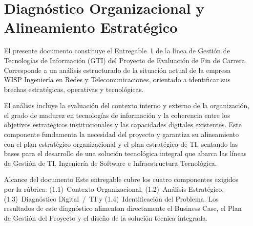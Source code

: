 \chapter{Diagnóstico Organizacional y Alineamiento Estratégico}
\label{chap:diagnostico}



El presente documento constituye el Entregable~1 de la línea de Gestión de
Tecnologías de Información (GTI) del Proyecto de Evaluación de Fin de Carrera.
Corresponde a un análisis estructurado de la situación actual de la empresa
WISP Ingeniería en Redes y Telecomunicaciones, orientado a identificar sus
brechas estratégicas, operativas y tecnológicas.

El análisis incluye la evaluación del contexto interno y externo de la
organización, el grado de madurez en tecnologías de información y la coherencia
entre los objetivos estratégicos institucionales y las capacidades digitales
existentes. Este componente fundamenta la necesidad del proyecto y garantiza su
alineamiento con el plan estratégico organizacional y el plan estratégico de TI,
sentando las bases para el desarrollo de una solución tecnológica integral que
abarca las líneas de Gestión de TI, Ingeniería de Software e Infraestructura
Tecnológica.

\begin{upeubox}{Alcance del documento}
Este entregable cubre los cuatro componentes exigidos por la rúbrica:
(1.1)~Contexto Organizacional, (1.2)~Análisis Estratégico,
(1.3)~Diagnóstico Digital~/~TI y (1.4)~Identificación del Problema. Los
resultados de este diagnóstico alimentan directamente el Business Case, el Plan
de Gestión del Proyecto y el diseño de la solución técnica integrada.
\end{upeubox}


